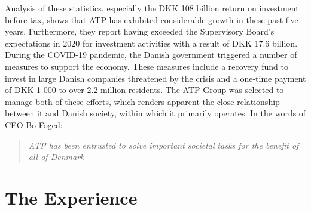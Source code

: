 \documentclass[11pt,titlepage]{article}
\begin{document}
Analysis of these statistics, especially the DKK 108 billion return on investment before tax, shows that ATP has exhibited considerable growth in these past five years. Furthermore, they report having exceeded the Supervisory Board's expectations in 2020 for investment activities with a result of DKK 17.6 billion.\cite{anno_report} During the COVID-19 pandemic, the Danish government triggered a number of measures to support the economy. These measures include a recovery fund to invest in large Danish companies threatened by the crisis and a one-time payment of DKK 1 000 to over 2.2 million residents. The ATP Group was selected to manage both of these efforts, which renders apparent the close relationship between it and Danish society, within which it primarily operates.\cite{covid_response} In the words of CEO Bo Foged:

\begin{quote}
    \color{dgreen}
    \textit{ATP has been entrusted to solve important societal tasks for the benefit of all of Denmark}
\end{quote}


\newpage

%
%
\section{The Experience}


\newpage

%
%
    
    \begin{flushleft}
        
    \end{flushleft}
\end{document}
